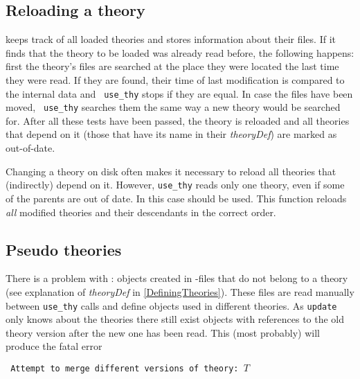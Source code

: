 \subsection{Reloading a theory}

 keeps track of all loaded theories and stores information
about their files.  If it finds that the theory to be loaded was already read
before, the following happens: first the theory's files are searched at the
place they were located the last time they were read. If they are found,
their time of last modification is compared to the internal data and {\tt
  use_thy} stops if they are equal. In case the files have been moved, {\tt
  use_thy} searches them the same way a new theory would be searched for.
After all these tests have been passed, the theory is reloaded and all
theories that depend on it (those that have its name in their {\it
  theoryDef}) are marked as out-of-date.
\begin{warn}
  Changing a theory on disk often makes it necessary to reload all theories
  that (indirectly) depend on it. However, {\tt use_thy} reads only one
  theory, even if some of the parents are out of date. In this case
   should be used.  This function reloads {\em all}
  modified theories and their descendants in the correct order.
\end{warn}


\subsection{Pseudo theories}

There is a problem with : objects created in \ML-files that
do not belong to a theory (see explanation of {\it theoryDef} in
\ref{DefiningTheories}).  These files are read manually between {\tt use_thy}
calls and define objects used in different theories.  As {\tt update} only
knows about the theories there still exist objects with references to the old
theory version after the new one has been read.  This (most probably) will
produce the fatal error
\begin{center} \tt
Attempt to merge different versions of theory: $T$
\end{center}

